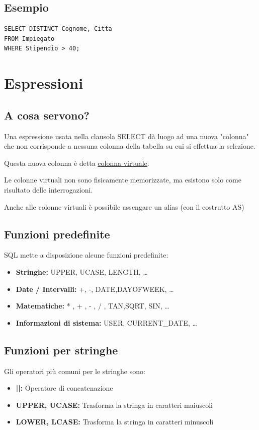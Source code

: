 \subsection{Esempio}
\begin{lstlisting}[language=sql_generic]
SELECT DISTINCT Cognome, Citta 
FROM Impiegato 
WHERE Stipendio > 40;
\end{lstlisting}

\section{Espressioni}
\subsection{A cosa servono?}
Una espressione usata nella clausola SELECT dà luogo ad una nuova "colonna" che non corrisponde a nessuna colonna della tabella su cui si effettua la selezione.

Questa nuova colonna è detta \underline{colonna virtuale}.

Le colonne virtuali non sono fisicamente memorizzate, ma esistono solo come risultato delle interrogazioni.

Anche alle colonne virtuali è possibile assengare un alias (con il costrutto AS)

\subsection{Funzioni predefinite}
SQL mette a disposizione alcune funzioni predefinite:
\begin{itemize}
    \item \textbf{Stringhe:} UPPER, UCASE, LENGTH, \dots
    \item \textbf{Date / Intervalli:} +, -, DATE,DAYOFWEEK, \dots
    \item \textbf{Matematiche:} * , + , - , / , TAN,SQRT, SIN, \dots
    \item \textbf{Informazioni di sistema:} USER, CURRENT\_DATE, \dots
\end{itemize}

\subsection{Funzioni per stringhe}
Gli operatori più comuni per le stringhe sono:
\begin{itemize}
    \item \textbf{||:} Operatore di concatenazione
    \item \textbf{UPPER, UCASE:} Trasforma la stringa in caratteri maiuscoli
    \item \textbf{LOWER, LCASE:} Trasforma la stringa in caratteri minuscoli
\end{itemize}

